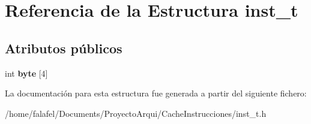 \hypertarget{structinst__t}{}\section{Referencia de la Estructura inst\+\_\+t}
\label{structinst__t}
\subsection*{Atributos públicos}
\begin{DoxyCompactItemize}
\item 
\mbox{\label{structinst__t_a4f6de678148c72ddfed41920a5ee908d}} 
int {\bfseries byte} \mbox{[}4\mbox{]}
\end{DoxyCompactItemize}


La documentación para esta estructura fue generada a partir del siguiente fichero\+:\begin{DoxyCompactItemize}
\item 
/home/falafel/\+Documents/\+Proyecto\+Arqui/\+Cache\+Instrucciones/inst\+\_\+t.\+h\end{DoxyCompactItemize}
